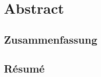 

\cleardoublepage
\chapter*{Abstract}
\lipsum[1-2]




\begin{otherlanguage}{german}
\cleardoublepage
\chapter*{Zusammenfassung}
\lipsum[1-2]
\end{otherlanguage}




\begin{otherlanguage}{french}
\cleardoublepage
\chapter*{Résumé}
\lipsum[1-2]
\end{otherlanguage}


